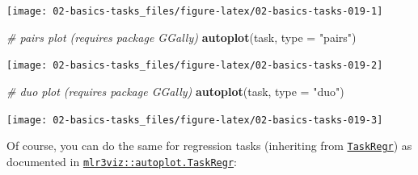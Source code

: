 \documentclass[]{scrbook}
\newenvironment{Shaded}{\begin{snugshade}}{\end{snugshade}}
\newcommand{\CommentTok}[1]{\textcolor[rgb]{0.56,0.35,0.01}{\textit{#1}}}
\newcommand{\DataTypeTok}[1]{\textcolor[rgb]{0.13,0.29,0.53}{#1}}
\newcommand{\DecValTok}[1]{\textcolor[rgb]{0.00,0.00,0.81}{#1}}
\newcommand{\KeywordTok}[1]{\textcolor[rgb]{0.13,0.29,0.53}{\textbf{#1}}}
\newcommand{\NormalTok}[1]{#1}
\newcommand{\OperatorTok}[1]{\textcolor[rgb]{0.81,0.36,0.00}{\textbf{#1}}}
\newcommand{\StringTok}[1]{\textcolor[rgb]{0.31,0.60,0.02}{#1}}
\renewenvironment{Shaded} {\begin{snugshade}\small} {\end{snugshade}}
\begin{document}
\begin{Shaded}
\end{Shaded}

\begin{center}\texttt{[image: 02-basics-tasks\_files/figure-latex/02-basics-tasks-019-1]} \end{center}

\begin{Shaded}
\begin{Highlighting}[]
\CommentTok{# pairs plot (requires package GGally)}
\KeywordTok{autoplot}\NormalTok{(task, }\DataTypeTok{type =} \StringTok{"pairs"}\NormalTok{)}
\end{Highlighting}
\end{Shaded}

\begin{center}\texttt{[image: 02-basics-tasks\_files/figure-latex/02-basics-tasks-019-2]} \end{center}

\begin{Shaded}
\begin{Highlighting}[]
\CommentTok{# duo plot (requires package GGally)}
\KeywordTok{autoplot}\NormalTok{(task, }\DataTypeTok{type =} \StringTok{"duo"}\NormalTok{)}
\end{Highlighting}
\end{Shaded}

\begin{center}\texttt{[image: 02-basics-tasks\_files/figure-latex/02-basics-tasks-019-3]} \end{center}

Of course, you can do the same for regression tasks (inheriting from \href{https://mlr3.mlr-org.com/reference/TaskRegr.html}{\texttt{TaskRegr}}) as documented in \href{https://mlr3viz.mlr-org.com/reference/autoplot.TaskRegr.html}{\texttt{mlr3viz::autoplot.TaskRegr}}:
\end{document}
